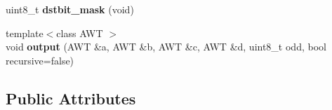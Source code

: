\begin{DoxyCompactItemize}
\item 
\hypertarget{structpc98__egc__shifter_a6d79f5e565263844efd0f70cd8cc8761}{uint8\-\_\-t {\bfseries dstbit\-\_\-mask} (void)}\label{structpc98__egc__shifter_a6d79f5e565263844efd0f70cd8cc8761}

\item 
\hypertarget{structpc98__egc__shifter_a4b4c6a8e53b15237e1f0e9c39c7fed7a}{{\footnotesize template$<$class A\-W\-T $>$ }\\void {\bfseries output} (A\-W\-T \&a, A\-W\-T \&b, A\-W\-T \&c, A\-W\-T \&d, uint8\-\_\-t odd, bool recursive=false)}\label{structpc98__egc__shifter_a4b4c6a8e53b15237e1f0e9c39c7fed7a}

\end{DoxyCompactItemize}
\subsection*{Public Attributes}
